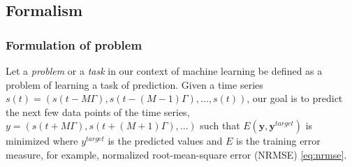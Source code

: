   \subsection{Formalism}
  \subsubsection{Formulation of problem}
    Let a \textit{problem} or a \textit{task} in our context of machine learning be defined as a problem of learning  a task of prediction. Given a time series ${s(t)} = (s(t-M\Gamma),  s(t-(M-1)\Gamma), \hdots, s(t))$, our goal is  to predict the next few data points of the time series, $y = ( s(t + M\Gamma), s(t+(M+1)\Gamma),\hdots)$ such that $E(\mathbf{y}, \mathbf{y}^{target})$ is minimized where $y^{target}$ is the predicted values and  $E$ is the training error measure, for example, normalized root-mean-square error (NRMSE) \eqref{eq:nrmse}.
    \\
    
    
